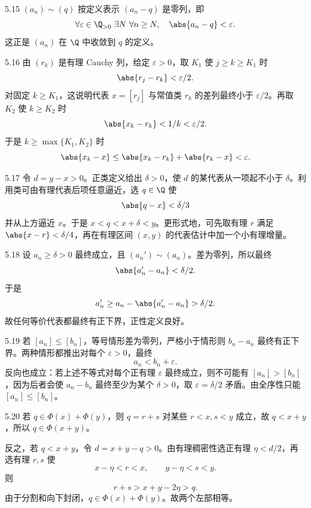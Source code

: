 \begin{solution}{5.15}
\((a_n)\sim(q)\) 按定义表示 \((a_n-q)\) 是零列，即
\[
 \forall\varepsilon\in\Q_{>0}\ \exists N\
 \forall n\ge N,\quad\abs{a_n-q}<\varepsilon.
\]
这正是 \((a_n)\) 在 \(\Q\) 中收敛到 \(q\) 的定义。
\end{solution}

\begin{solution}{5.16}
由 \((r_k)\) 是有理 Cauchy 列，给定 \(\varepsilon>0\)，取 \(K_1\) 使 \(j\ge k\ge K_1\) 时
\[
 \abs{r_j-r_k}<\varepsilon/2.
\]
对固定 \(k\ge K_1\)，这说明代表 \(x=[r_j]\) 与常值类 \(r_k\) 的差列最终小于 \(\varepsilon/2\)。再取 \(K_2\) 使 \(k\ge K_2\) 时
\[
 \abs{x_k-r_k}<1/k<\varepsilon/2.
\]
于是 \(k\ge\max\{K_1,K_2\}\) 时
\[
 \abs{x_k-x}\le\abs{x_k-r_k}+\abs{r_k-x}<\varepsilon.
\]
\end{solution}

\begin{solution}{5.17}
令 \(d=y-x>0\)。正类定义给出 \(\delta>0\)，使 \(d\) 的某代表从一项起不小于 \(\delta\)。利用类可由有理代表后项任意逼近，选 \(q\in\Q\) 使
\[
 \abs{q-x}<\delta/3
\]
并从上方逼近 \(x\)。于是 \(x<q<x+\delta<y\)。更形式地，可先取有理 \(r\) 满足 \(\abs{x-r}<\delta/4\)，再在有理区间 \((x,y)\) 的代表估计中加一个小有理增量。
\end{solution}

\begin{solution}{5.18}
设 \(a_n\ge\delta>0\) 最终成立，且 \((a_n')\sim(a_n)\)。差为零列，所以最终
\[
 \abs{a_n'-a_n}<\delta/2.
\]
于是
\[
 a_n'\ge a_n-\abs{a_n'-a_n}>\delta/2.
\]
故任何等价代表都最终有正下界，正性定义良好。
\end{solution}

\begin{solution}{5.19}
若 \([a_n]\le[b_n]\)，等号情形差为零列，严格小于情形则 \(b_n-a_n\) 最终有正下界。两种情形都推出对每个 \(\varepsilon>0\)，最终
\[
 a_n<b_n+\varepsilon.
\]
反向也成立：若上述不等式对每个正有理 \(\varepsilon\) 最终成立，则不可能有 \([a_n]>[b_n]\)，因为后者会使 \(a_n-b_n\) 最终至少为某个 \(\delta>0\)，取 \(\varepsilon=\delta/2\) 矛盾。由全序性只能 \([a_n]\le[b_n]\)。
\end{solution}

\begin{solution}{5.20}
若 \(q\in\Phi(x)+\Phi(y)\)，则 \(q=r+s\) 对某些 \(r<x,s<y\) 成立，故 \(q<x+y\)，所以 \(q\in\Phi(x+y)\)。

反之，若 \(q<x+y\)，令 \(d=x+y-q>0\)。由有理稠密性选正有理 \(\eta<d/2\)，再选有理 \(r,s\) 使
\[
 x-\eta<r<x,\qquad y-\eta<s<y.
\]
则
\[
 r+s>x+y-2\eta>q.
\]
由于分割和向下封闭，\(q\in\Phi(x)+\Phi(y)\)。故两个左部相等。
\end{solution}

